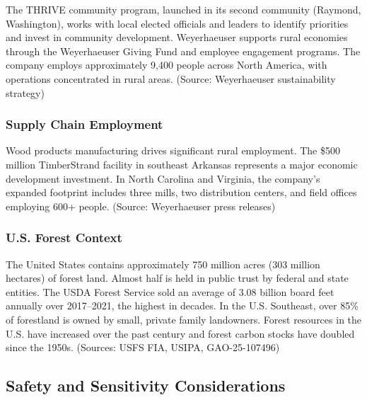 \documentclass[11pt,letterpaper]{article}
\begin{document}
The THRIVE community program, launched in its second community (Raymond, Washington), works with local elected officials and leaders to identify priorities and invest in community development. Weyerhaeuser supports rural economies through the Weyerhaeuser Giving Fund and employee engagement programs. The company employs approximately 9,400 people across North America, with operations concentrated in rural areas. (Source: Weyerhaeuser sustainability strategy)

\subsubsection{Supply Chain Employment}

Wood products manufacturing drives significant rural employment. The \$500 million TimberStrand facility in southeast Arkansas represents a major economic development investment. In North Carolina and Virginia, the company's expanded footprint includes three mills, two distribution centers, and field offices employing 600+ people. (Source: Weyerhaeuser press releases)

\subsubsection{U.S. Forest Context}

The United States contains approximately 750 million acres (303 million hectares) of forest land. Almost half is held in public trust by federal and state entities. The USDA Forest Service sold an average of 3.08 billion board feet annually over 2017--2021, the highest in decades. In the U.S. Southeast, over 85\% of forestland is owned by small, private family landowners. Forest resources in the U.S. have increased over the past century and forest carbon stocks have doubled since the 1950s. (Sources: USFS FIA, USIPA, GAO-25-107496)

\subsection{Safety and Sensitivity Considerations}
\end{document}
